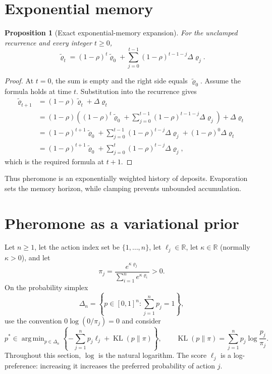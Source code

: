 \documentclass[11pt,oneside]{book}
\newtheorem{proposition}[definition]{Proposition}
\theoremstyle{remark}
\DeclareMathOperator*{\argmin}{arg\,min}
\DeclareMathOperator{\KL}{KL}
\begin{document}
\section{Exponential memory}

\begin{proposition}[Exact exponential-memory expansion]
For the unclamped recurrence and every integer $t\ge0$,
\[
\widetilde\varrho_t=(1-\rho)^t\widetilde\varrho_0
+\sum_{j=0}^{t-1}(1-\rho)^{t-1-j}\Delta\varrho_j.
\]
\end{proposition}

\begin{proof}
At $t=0$, the sum is empty and the right side equals
$\widetilde\varrho_0$.
Assume the formula holds at time $t$. Substitution into the recurrence gives
\[
\begin{aligned}
\widetilde\varrho_{t+1}
&=(1-\rho)\widetilde\varrho_t+\Delta\varrho_t\\
&=(1-\rho)\left((1-\rho)^t\widetilde\varrho_0+
\sum_{j=0}^{t-1}(1-\rho)^{t-1-j}\Delta\varrho_j\right)
+\Delta\varrho_t\\
&=(1-\rho)^{t+1}\widetilde\varrho_0+
\sum_{j=0}^{t-1}(1-\rho)^{t-j}\Delta\varrho_j+
(1-\rho)^0\Delta\varrho_t\\
&=(1-\rho)^{t+1}\widetilde\varrho_0+
\sum_{j=0}^{t}(1-\rho)^{t-j}\Delta\varrho_j,
\end{aligned}
\]
which is the required formula at $t+1$.
\end{proof}

Thus pheromone is an exponentially weighted history of deposits. Evaporation sets the memory horizon, while clamping prevents unbounded accumulation.

\section{Pheromone as a variational prior}

Let $n\ge1$, let the action index set be $\{1,\ldots,n\}$, let
$\ell_j\in\mathbb R$, let
$\kappa\in\mathbb R$ (normally $\kappa>0$), and let
\[
\pi_j=\frac{e^{\kappa\varrho_j}}{\sum_{i=1}^n e^{\kappa\varrho_i}}>0.
\]
On the probability simplex
\[
\Delta_n=\left\{p\in[0,1]^n:\sum_{j=1}^np_j=1\right\},
\]
use the convention $0\log(0/\pi_j)=0$ and consider
\[
p^*\in\argmin_{p\in\Delta_n}
\left\{-\sum_{j=1}^np_j\ell_j+\KL(p\|\pi)\right\},
\qquad
\KL(p\|\pi)=\sum_{j=1}^np_j\log\frac{p_j}{\pi_j}.
\]
Throughout this section, $\log$ is the natural logarithm. The score
$\ell_j$ is a log-preference: increasing it increases the preferred
probability of action $j$.
\end{document}
